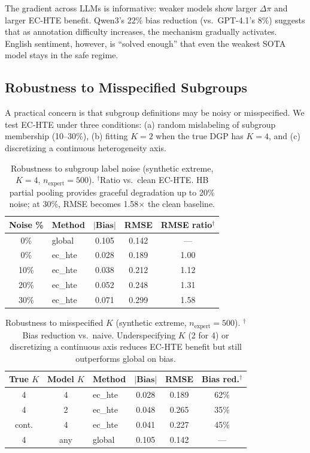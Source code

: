 \documentclass[11pt,a4paper]{article}
\begin{document}
The gradient across LLMs is informative: weaker models show larger $\Delta\pi$ and larger EC-HTE benefit.
Qwen3's 22\% bias reduction (vs.\ GPT-4.1's 8\%) suggests that as annotation difficulty increases, the mechanism gradually activates.
English sentiment, however, is ``solved enough'' that even the weakest SOTA model stays in the safe regime.

\subsection{Robustness to Misspecified Subgroups}
\label{sec:robustness}

A practical concern is that subgroup definitions may be noisy or misspecified.
We test EC-HTE under three conditions: (a) random mislabeling of subgroup membership (10--30\%), (b) fitting $K=2$ when the true DGP has $K=4$, and (c) discretizing a continuous heterogeneity axis.

\begin{table}[t]
\centering
\small
\begin{tabular}{@{}clccc@{}}
\toprule
\textbf{Noise \%} & \textbf{Method} & $|\textbf{Bias}|$ & \textbf{RMSE} & \textbf{RMSE ratio}$^\dagger$ \\
\midrule
0\% & global & 0.105 & 0.142 & --- \\
0\% & ec\_hte & 0.028 & 0.189 & 1.00 \\
10\% & ec\_hte & 0.038 & 0.212 & 1.12 \\
20\% & ec\_hte & 0.052 & 0.248 & 1.31 \\
30\% & ec\_hte & 0.071 & 0.299 & 1.58 \\
\bottomrule
\end{tabular}
\caption{Robustness to subgroup label noise (synthetic extreme, $K=4$, $n_{\text{expert}}=500$). $^\dagger$Ratio vs.\ clean EC-HTE. HB partial pooling provides graceful degradation up to 20\% noise; at 30\%, RMSE becomes 1.58$\times$ the clean baseline.}
\label{tab:robustness_noise}
\end{table}

\begin{table}[t]
\centering
\small
\begin{tabular}{@{}cclccc@{}}
\toprule
\textbf{True $K$} & \textbf{Model $K$} & \textbf{Method} & $|\textbf{Bias}|$ & \textbf{RMSE} & \textbf{Bias red.}$^\dagger$ \\
\midrule
4 & 4 & ec\_hte & 0.028 & 0.189 & 62\% \\
4 & 2 & ec\_hte & 0.048 & 0.265 & 35\% \\
cont. & 4 & ec\_hte & 0.041 & 0.227 & 45\% \\
4 & any & global & 0.105 & 0.142 & --- \\
\bottomrule
\end{tabular}
\caption{Robustness to misspecified $K$ (synthetic extreme, $n_{\text{expert}}=500$). $^\dagger$Bias reduction vs.\ naive. Underspecifying $K$ (2 for 4) or discretizing a continuous axis reduces EC-HTE benefit but still outperforms global on bias.}
\label{tab:robustness_k}
\end{table}
\end{document}
